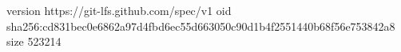 version https://git-lfs.github.com/spec/v1
oid sha256:cd831bec0e6862a97d4fbd6ec55d663050c90d1b4f2551440b68f56e753842a8
size 523214
